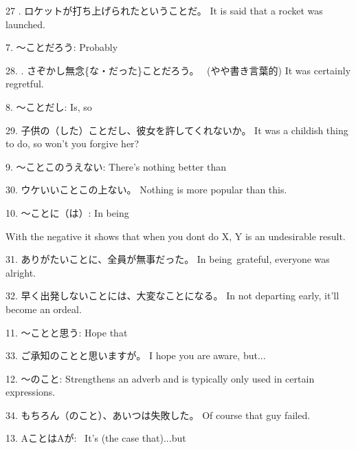 \par{27 . ロケットが打ち上げられたということだ。 \hfill\break
It is said that a rocket was launched. }

\par{7. ～ことだろう: Probably }
 
\par{28. . さぞかし無念\{な・だった\}ことだろう。  (やや書き言葉的) \hfill\break
It was certainly regretful. }
 
\par{8. ～ことだし: Is, so }
 
\par{29. 子供の（した）ことだし、彼女を許してくれないか。 \hfill\break
It was a childish thing to do, so won't you forgive her? }
 
\par{9. ～ことこのうえない: There's nothing better than }
 
\par{30. ウケいいことこの上ない。 \hfill\break
Nothing is more popular than this. }
 
\par{10. ～ことに（は）: In being }
 
\par{With the negative it shows that when you don\textquotesingle t do X, Y is an undesirable result. }
 
\par{31. ありがたいことに、全員が無事だった。 \hfill\break
In being grateful, everyone was alright. }

\par{32. 早く出発しないことには、大変なことになる。 \hfill\break
In not departing early, it'll become an ordeal. }
 
\par{11. ～ことと思う:  Hope that }
 
\par{33. ご承知のことと思いますが。 \hfill\break
I hope you are aware, but\dothyp{}\dothyp{}\dothyp{} }
 
\par{12. ～のこと: Strengthens an adverb and is typically only used in certain expressions. }
 
\par{34. もちろん（のこと）、あいつは失敗した。 \hfill\break
Of course that guy failed. }
 
\par{13. AことはAが:  It's (the case that)\dothyp{}\dothyp{}\dothyp{}but }
 
